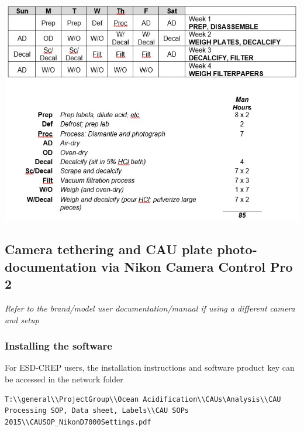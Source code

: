 \documentclass[]{book}
\begin{document}
\includegraphics{images/CAU_table.jpg}

\hypertarget{camera-tethering-and-cau-plate-photo-documentation-via-nikon-camera-control-pro-2}{%
\subsection{Camera tethering and CAU plate photo-documentation via Nikon Camera Control Pro 2}\label{camera-tethering-and-cau-plate-photo-documentation-via-nikon-camera-control-pro-2}}

\emph{Refer to the brand/model user documentation/manual if using a different camera and setup}

\hypertarget{installing-the-software}{%
\subsubsection{Installing the software}\label{installing-the-software}}

For ESD-CREP users, the installation instructions and software product key can be accessed in the network folder

\begin{verbatim}
T:\\general\\ProjectGroup\\Ocean Acidification\\CAUs\Analysis\\CAU Processing SOP, Data sheet, Labels\\CAU SOPs 2015\\CAUSOP_NikonD7000Settings.pdf
\end{verbatim}
\end{document}
